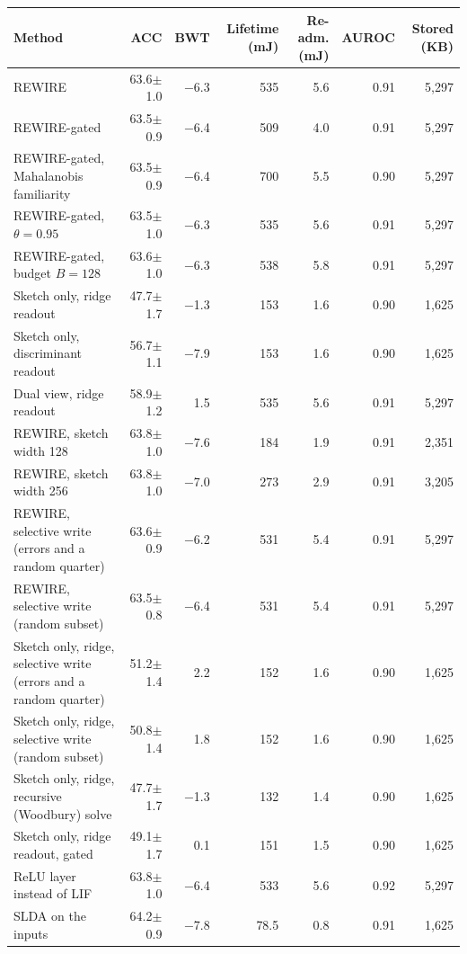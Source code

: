 \begin{tabular*}{\textwidth}{@{\extracolsep{\fill}}lrrrrrr@{}}
\toprule
Method & ACC & BWT & Lifetime (mJ) & Re-adm. (mJ) & AUROC & Stored (KB) \\
\midrule
REWIRE & 63.6$\pm$1.0 & \ensuremath{-}6.3 & 535 & 5.6 & 0.91 & 5,297 \\
REWIRE-gated & 63.5$\pm$0.9 & \ensuremath{-}6.4 & 509 & 4.0 & 0.91 & 5,297 \\
REWIRE-gated, Mahalanobis familiarity & 63.5$\pm$0.9 & \ensuremath{-}6.4 & 700 & 5.5 & 0.90 & 5,297 \\
REWIRE-gated, $\theta=0.95$ & 63.5$\pm$1.0 & \ensuremath{-}6.3 & 535 & 5.6 & 0.91 & 5,297 \\
REWIRE-gated, budget $B=128$ & 63.6$\pm$1.0 & \ensuremath{-}6.3 & 538 & 5.8 & 0.91 & 5,297 \\
Sketch only, ridge readout & 47.7$\pm$1.7 & \ensuremath{-}1.3 & 153 & 1.6 & 0.90 & 1,625 \\
Sketch only, discriminant readout & 56.7$\pm$1.1 & \ensuremath{-}7.9 & 153 & 1.6 & 0.90 & 1,625 \\
Dual view, ridge readout & 58.9$\pm$1.2 & 1.5 & 535 & 5.6 & 0.91 & 5,297 \\
REWIRE, sketch width 128 & 63.8$\pm$1.0 & \ensuremath{-}7.6 & 184 & 1.9 & 0.91 & 2,351 \\
REWIRE, sketch width 256 & 63.8$\pm$1.0 & \ensuremath{-}7.0 & 273 & 2.9 & 0.91 & 3,205 \\
REWIRE, selective write (errors and a random quarter) & 63.6$\pm$0.9 & \ensuremath{-}6.2 & 531 & 5.4 & 0.91 & 5,297 \\
REWIRE, selective write (random subset) & 63.5$\pm$0.8 & \ensuremath{-}6.4 & 531 & 5.4 & 0.91 & 5,297 \\
Sketch only, ridge, selective write (errors and a random quarter) & 51.2$\pm$1.4 & 2.2 & 152 & 1.6 & 0.90 & 1,625 \\
Sketch only, ridge, selective write (random subset) & 50.8$\pm$1.4 & 1.8 & 152 & 1.6 & 0.90 & 1,625 \\
Sketch only, ridge, recursive (Woodbury) solve & 47.7$\pm$1.7 & \ensuremath{-}1.3 & 132 & 1.4 & 0.90 & 1,625 \\
Sketch only, ridge readout, gated & 49.1$\pm$1.7 & 0.1 & 151 & 1.5 & 0.90 & 1,625 \\
ReLU layer instead of LIF & 63.8$\pm$1.0 & \ensuremath{-}6.4 & 533 & 5.6 & 0.92 & 5,297 \\
SLDA on the inputs & 64.2$\pm$0.9 & \ensuremath{-}7.8 & 78.5 & 0.8 & 0.91 & 1,625 \\

\end{tabular*}
